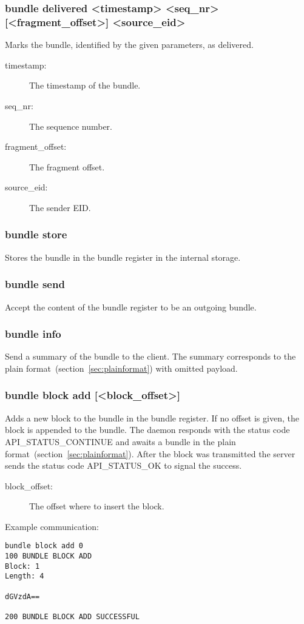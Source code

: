 \documentclass[12pt, a4paper]{scrartcl}
\begin{document}
\subsubsection*{bundle delivered <timestamp> <seq\_nr> [<fragment\_offset>] <source\_eid>}
Marks the bundle, identified by the given parameters, as delivered.
\begin{description}
\item[timestamp:] The timestamp of the bundle.
\item[seq\_nr:] The sequence number.
\item[fragment\_offset:] The fragment offset.
\item[source\_eid:] The sender EID.
\end{description}
\subsubsection*{bundle store}
Stores the bundle in the bundle register in the internal storage.
\subsubsection*{bundle send}
Accept the content of the bundle register to be an outgoing bundle.
\subsubsection*{bundle info}
Send a summary of the bundle to the client.
The summary corresponds to the plain format~(section~\ref{sec:plainformat}) with omitted payload.
\subsubsection*{bundle block add [<block\_offset>]}
Adds a new block to the bundle in the bundle register.
If no offset is given, the block is appended to the bundle.
The daemon responds with the status code API\_STATUS\_CONTINUE and awaits a bundle in the plain format~(section~\ref{sec:plainformat}).
After the block was transmitted the server sends the status code API\_STATUS\_OK to signal the success.
\begin{description}
\item[block\_offset:] The offset where to insert the block.
\end{description}
Example communication:\\
\makebox[\textwidth]{\hrulefill}
\begin{verbatim}
bundle block add 0
100 BUNDLE BLOCK ADD
Block: 1
Length: 4

dGVzdA==

200 BUNDLE BLOCK ADD SUCCESSFUL
\end{verbatim}
\makebox[\textwidth]{\hrulefill}
\end{document}
